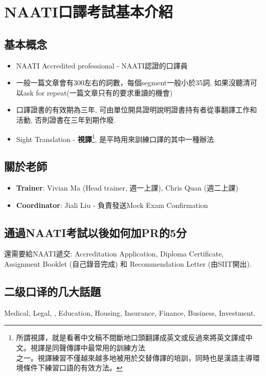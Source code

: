 \chapter{NAATI口譯考試基本介紹}
\section{基本概念}
\begin{itemize}
  \itemsep0em
  \item NAATI Accredited professional - NAATI認證的口譯員
  \item 一般一篇文章會有300左右的詞數，每個segment一般小於35詞, 如果沒聽清可以ask for repeat(一篇文章只有的要求重讀的機會)
  \item 口譯證書的有效期為三年, 可由單位開具證明說明證書持有者從事翻譯工作和活動, 否則證書在三年到期作廢.
  \item Sight Translation - \textbf{視譯}\footnote{所謂視譯，就是看著中文稿不間斷地口頭翻譯成英文或反過來將英文譯成中文。視譯是同聲傳譯中最常用的訓練方法 \\ 之一。視譯練習不僅越來越多地被用於交替傳譯的培訓，同時也是漢語主導環境條件下練習口語的有效方法。}, 是平時用來訓練口譯的其中一種辦法.
\end{itemize}

\section{關於老師}
\begin{itemize}
  \itemsep0em
  \item \textbf{Trainer}: Vivian Ma (Head trainer, 週一上課), Chris Quan (週二上課)
  \item \textbf{Coordinator}: Jiali Liu - 負責發送Mock Exam Confirmation
\end{itemize}

\section{通過NAATI考試以後如何加PR的5分}
還需要給NAATI遞交: Accreditation Application, Diploma Certificate, Assignment Booklet (自己錄音完成) 和 Recommendation Letter (由SIIT開出).

\section{二级口译的几大話題}
Medical, Legal, , Education, Housing, Insurance, Finance, Business, Investment.

